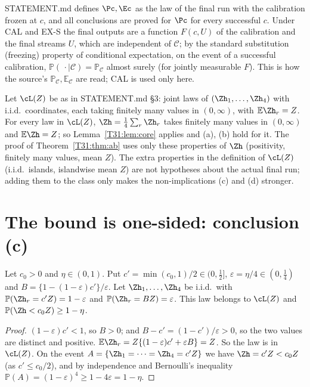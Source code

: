 \documentclass[11pt]{report}
\begin{document}
\begin{T31remark}\label{T31:rem:cond}
STATEMENT.md defines $\Pc,\Ec$ as the law of the final run with the calibration frozen at $c$, and all conclusions are
proved for $\Pc$ for every successful $c$. Under CAL and EX-S the final outputs are a function $F(c,U)$ of the
calibration and the final streams $U$, which are independent of $\mathcal C$; by the standard substitution (freezing)
property of conditional expectation, on the event of a successful calibration,
$\mathbb{P}(\,\cdot\mid\mathcal C)=\mathbb{P}_{\mathcal C}$ almost surely (for jointly measurable $F$). This is how the
source's $\mathbb{P}_{\mathcal C},\mathbb{E}_{\mathcal C}$ are read; CAL is used only here.
\end{T31remark}

\begin{T31remark}\label{T31:rem:class}
Let $\cL(Z)$ be as in STATEMENT.md \S3: joint laws of $(\Zh_1,\dots,\Zh_4)$ with i.i.d.\ coordinates, each taking finitely
many values in $(0,\infty)$, with $\mathbb{E}\Zh_r=Z$. For every law in $\cL(Z)$, $\Zh=\frac14\sum_r\Zh_r$ takes finitely
many values in $(0,\infty)$ and $\mathbb{E}\Zh=Z$; so Lemma~\ref{T31:lem:core} applies and (a), (b) hold for it. The proof of
Theorem~\ref{T31:thm:ab} uses only these properties of $\Zh$ (positivity, finitely many values, mean $Z$). The extra
properties in the definition of $\cL(Z)$ (i.i.d.\ islands, islandwise mean $Z$) are not hypotheses about the actual final
run; adding them to the class only makes the non-implications (c) and (d) stronger.
\end{T31remark}

\section{The bound is one-sided: conclusion (c)}

\begin{T31lemma}\label{T31:lem:rare}
Let $c_0>0$ and $\eta\in(0,1)$. Put $c'=\min(c_0,1)/2\in(0,\tfrac12]$, $\varepsilon=\eta/4\in(0,\tfrac14)$ and
$B=\{1-(1-\varepsilon)c'\}/\varepsilon$. Let $\Zh_1,\dots,\Zh_4$ be i.i.d.\ with $\mathbb{P}(\Zh_r=c'Z)=1-\varepsilon$ and
$\mathbb{P}(\Zh_r=BZ)=\varepsilon$. This law belongs to $\cL(Z)$ and $\mathbb{P}(\Zh<c_0Z)\ge1-\eta$.
\end{T31lemma}

\begin{proof}
$(1-\varepsilon)c'<1$, so $B>0$; and $B-c'=(1-c')/\varepsilon>0$, so the two values are distinct and positive.
$\mathbb{E}\Zh_r=Z\{(1-\varepsilon)c'+\varepsilon B\}=Z$. So the law is in $\cL(Z)$. On the event
$A=\{\Zh_1=\dots=\Zh_4=c'Z\}$ we have $\Zh=c'Z<c_0Z$ (as $c'\le c_0/2$), and by independence and Bernoulli's inequality
$\mathbb{P}(A)=(1-\varepsilon)^4\ge1-4\varepsilon=1-\eta$.
\end{proof}
\end{document}
